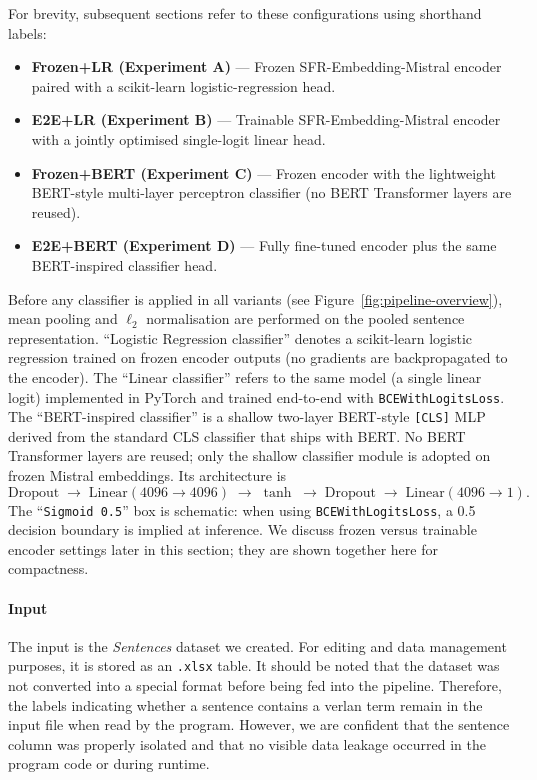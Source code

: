 \documentclass[12pt]{article}
\begin{document}
\noindent For brevity, subsequent sections refer to these configurations using shorthand labels:
\begin{itemize}
  \item \textbf{Frozen+LR (Experiment A)} --- Frozen SFR-Embedding-Mistral encoder paired with a scikit-learn logistic-regression head.
  \item \textbf{E2E+LR (Experiment B)} --- Trainable SFR-Embedding-Mistral encoder with a jointly optimised single-logit linear head.
  \item \textbf{Frozen+BERT (Experiment C)} --- Frozen encoder with the lightweight BERT-style multi-layer perceptron classifier (no BERT Transformer layers are reused).
  \item \textbf{E2E+BERT (Experiment D)} --- Fully fine-tuned encoder plus the same BERT-inspired classifier head.
\end{itemize}

\noindent Before any classifier is applied in all variants (see Figure~\ref{fig:pipeline-overview}), mean pooling and \(\ell_{2}\) normalisation are performed on the pooled sentence representation. ``Logistic Regression classifier'' denotes a scikit-learn logistic regression trained on frozen encoder outputs (no gradients are backpropagated to the encoder). The ``Linear classifier'' refers to the same model (a single linear logit) implemented in PyTorch and trained end-to-end with \texttt{BCEWithLogitsLoss}. The ``BERT-inspired classifier'' is a shallow two-layer BERT-style \texttt{[CLS]} MLP derived from the standard CLS classifier that ships with BERT. No BERT Transformer layers are reused; only the shallow classifier module is adopted on frozen Mistral embeddings. Its architecture is
\[
\text{Dropout} \;\to\; \text{Linear}(4096\!\to\!4096) \;\to\; \tanh \;\to\; \text{Dropout} \;\to\; \text{Linear}(4096\!\to\!1).
\]
The ``\texttt{Sigmoid 0.5}'' box is schematic: when using \texttt{BCEWithLogitsLoss}, a 0.5 decision boundary is implied at inference. We discuss frozen versus trainable encoder settings later in this section; they are shown together here for compactness.


\paragraph{Input}
The input is the \textit{Sentences} dataset we created. For editing and data management purposes, it is stored as an \texttt{.xlsx} table. It should be noted that the dataset was not converted into a special format before being fed into the pipeline. Therefore, the labels indicating whether a sentence contains a verlan term remain in the input file when read by the program. However, we are confident that the sentence column was properly isolated and that no visible data leakage occurred in the program code or during runtime.
\end{document}
